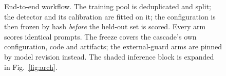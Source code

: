 \documentclass[journal]{IEEEtran}
\begin{document}
\begin{figure}[h]
\caption{End-to-end workflow. The training pool is deduplicated and split; the
detector and its calibration are fitted on it; the configuration is then frozen
by hash \emph{before} the held-out set is scored. Every arm scores identical
prompts. The freeze covers the cascade's own configuration, code and artifacts;
the external-guard arms are pinned by model revision instead. The shaded
inference block is expanded in Fig.~\ref{fig:arch}.}
\label{abr:fig:overview}
\end{figure}
\end{document}
